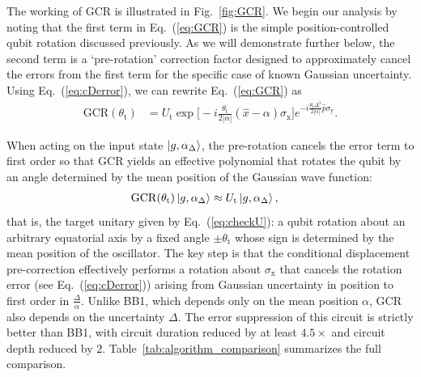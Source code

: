 \documentclass[aps,prx,showpacs,notitlepage,twocolumn,superscriptaddress,nofootinbib,preprintnumbers,floatfix,10pt, longbibliography]{revtex4-2}
\begin{document}
The working of GCR is illustrated in Fig.~\ref{fig:GCR}. We begin our analysis by noting that the first term in Eq.~(\ref{eq:GCR}) is the simple position-controlled qubit rotation discussed previously.  As we will demonstrate further below, the second term is a `pre-rotation' correction factor designed to approximately cancel the errors from the first term for the specific case of known Gaussian uncertainty. Using Eq.~(\ref{eq:cDerror}), we can rewrite Eq.~(\ref{eq:GCR}) as
\begin{align}
\textrm{GCR}(\theta_\textrm{t})&=U_\textrm{t}\exp\Bigg[-i\frac{\theta_\mathrm{t}}{2|\alpha|}(\hat x-\alpha)\sigma_\mathrm{x}\Bigg] e^{-i\frac{\theta_\mathrm{t}\Delta^2}{2|\alpha|}\hat{p}\sigma_{\mathrm{y}}}.\label{eq:cDerror2}
\end{align}


When acting on the input state $\ket{g,\alpha_\Delta}$, the pre-rotation cancels the error term to first order so that GCR yields an effective polynomial that rotates the qubit by an angle determined by the mean position of the Gaussian wave function:
\begin{align}
  \mathrm{GCR}(\theta_\mathrm{t})\ket{g,\alpha_\Delta}&\approx %
  U_\mathrm{t}\ket{g,\alpha_\Delta},
  \label{eq:GCR_action}
\end{align}
that is, the target unitary given by Eq.~(\ref{eq:checkU}): a qubit rotation about an arbitrary equatorial axis by a fixed angle $\pm\theta_\mathrm{t}$ whose sign is determined by the mean position of the oscillator. The key step is that the conditional displacement pre-correction effectively performs a rotation about $\sigma_\mathrm{x}$ that cancels the rotation error (see Eq.~(\ref{eq:cDerror})) arising from Gaussian uncertainty in position to first order in $\frac{\Delta}{\alpha}$. Unlike BB1, which depends only on the mean position $\alpha$, GCR also depends on the uncertainty $\Delta$. The error suppression of this circuit is strictly better than BB1, with circuit duration reduced by at least $4.5\times$ and circuit depth reduced by $2$. Table~\ref{tab:algorithm_comparison} summarizes the full comparison.
\end{document}

